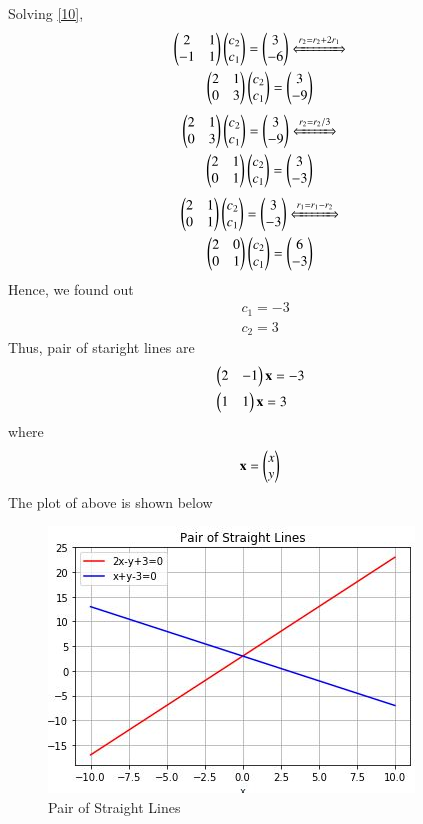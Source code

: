 \documentclass[journal,12pt,twocolumn]{IEEEtran}
\begin{document}
Solving \eqref{10},
\begin{multline}
\myvec{2 &1 \\ -1 &1} \myvec{c_2 \\ c_1} = \myvec{3\\-6} \xLeftrightarrow[]{r_2 = r_2 + 2r_1} \\
\myvec{2 &1 \\ 0 &3} \myvec{c_2 \\ c_1} = \myvec{3\\-9}
\end{multline}
\begin{multline}
	\myvec{2 &1 \\ 0 &3} \myvec{c_2 \\ c_1} = \myvec{3\\-9} \xLeftrightarrow[]{r_2 = r_2/3} \\
	\myvec{2 &1 \\ 0 &1} \myvec{c_2 \\ c_1} = \myvec{3\\-3}
\end{multline}
\begin{multline}
	\myvec{2 &1 \\ 0 &1} \myvec{c_2 \\ c_1} = \myvec{3\\-3} \xLeftrightarrow[]{r_1 = r_1-r_2} \\
	\myvec{2 &0 \\ 0 &1} \myvec{c_2 \\ c_1} = \myvec{6\\-3}
\end{multline}
Hence, we found out
\begin{align}
	&c_1 = -3 \\
	&c_2 = 3
\end{align}
Thus, pair of staright lines are
\begin{align}
& \begin{pmatrix}2 &-1\end{pmatrix}\mathbf{x} = -3 \\
& \begin{pmatrix}1 &1\end{pmatrix}\mathbf{x} = 3 
\end{align}
where
\begin{align}
\mathbf{x} = \begin{pmatrix}x \\ y\end{pmatrix}	
\end{align}
The plot of above is shown below 
\begin{figure}[!htb]
	
	\centering
	
	\includegraphics[width=\columnwidth]{assignment4fig.jpg}
	
	\caption{Pair of Straight Lines}
	
	\label{fig:1}
	
\end{figure}
\end{document}
